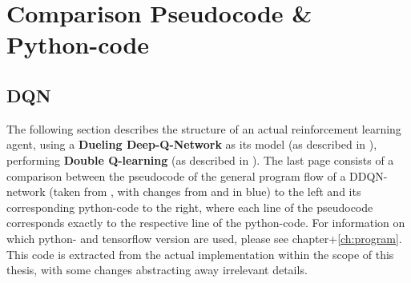 


\chapter{Comparison Pseudocode \& Python-code} %

\label{AppendixA} %

\vspace{-0.8cm}

\section{DQN}
\label{ap:dqn}

The following section describes the structure of an actual reinforcement learning agent, using a \textbf{Dueling Deep-Q-Network} as its model (as described in \cite{wang_dueling_2015}), performing \textbf{Double Q-learning} (as described in \cite{van_hasselt_deep_2015}). The last page consists of a comparison between the pseudocode of the general program flow of a DDQN-network (taken from \cite{mnih_human-level_2015}, with changes from \cite{van_hasselt_deep_2015} and \cite{lillicrap_continuous_2015} in blue) to the left and its corresponding python-code to the right, where each line of the pseudocode corresponds exactly to the respective line of the python-code. For information on which python- and tensorflow version are used, please see chapter+\ref{ch:program}. This code is extracted from the actual implementation within the scope of this thesis, with some changes abstracting away irrelevant details.\\


\begin{landscape}
	\begin{parcolumns}[distance=0.1em,colwidths={1=33em}]{2}
		\label{ap:dqn_comparison}
		\colchunk[1]{ }
		\colchunk[2]{  }
	\end{parcolumns}
\end{landscape}

